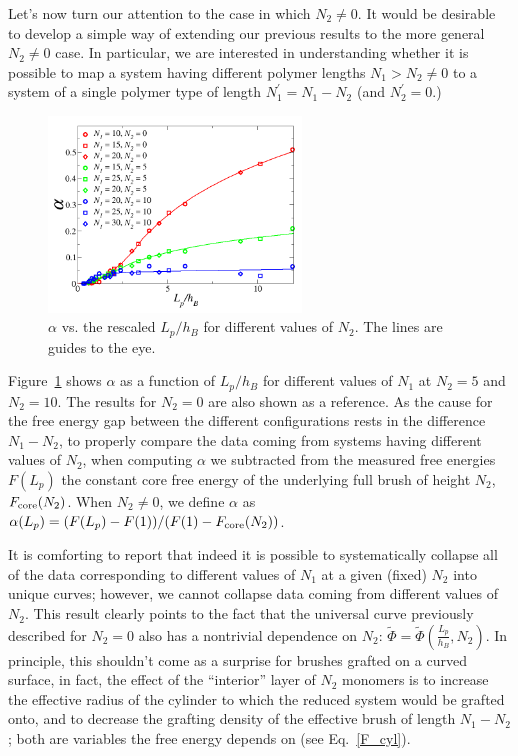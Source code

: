 Let's now turn our attention to the case in which $N_2\neq 0$.
It would be desirable to develop a simple way of extending our previous results to the more 
general $N_2 \neq 0$ case. In particular, we are interested in understanding whether it is possible
to map a system having different polymer  lengths $N_1 > N_2 \neq 0$ to a system of a single polymer type of length $N_1^\prime = N_1-N_2$ (and $N_2^\prime = 0$.)

\begin{figure}
	\begin{center}\includegraphics[width=0.6\textwidth]{brush/FvsLpscaleddiff}\end{center}
	\caption[$\alpha$ vs. the rescaled $L_p/h_B$ for different values of $N_2$]{$\alpha$ vs. the rescaled $L_p/h_B$ for different values of $N_2$.  The lines are guides to the eye.}\label{FvsLpscaleddiff}
\end{figure}

Figure~\ref{FvsLpscaleddiff} shows $\alpha$ as a function of $L_p/h_B$ for different values of $N_1$ at 
$N_2=5$ and $N_2=10$. The results for $N_2=0$ are also shown as a reference.
As the cause for the free energy gap between the different configurations 
rests in the difference  $N_1-N_2$, to properly compare the data coming from systems having 
different values of $N_2$, when computing $\alpha$
we subtracted from the measured free energies $F(L_p)$ the constant 
core free energy of the underlying full brush of height $N_2$, $F_{\rm core}(N_2)$.
When $N_2\neq0$, we define $\alpha$ as  $\alpha(L_p)=(F(L_p)-F(1))/(F(1)-F_{\rm core}(N_2))$.

It is comforting  to report that indeed it is possible to systematically collapse all of the data corresponding to 
different values of $N_1$ at a given (fixed) $N_2$ into unique curves;
however, we cannot collapse data coming from different values of $N_2$. This result clearly points to the fact that the universal curve previously described for $N_2=0$ also has a nontrivial dependence on $N_2$: $\tilde \Phi=\tilde \Phi (\frac{L_p}{h_B},N_2)$. 
In principle, this shouldn't come as a  surprise for brushes grafted on a curved surface,
in fact, the effect of the ``interior'' layer of $N_2$ monomers is to increase the effective radius of the cylinder to which the reduced system would be grafted onto, and to decrease the grafting density of the effective brush of length $N_1-N_2$; both are variables the free energy depends on (see Eq.~\ref{F_cyl}).

